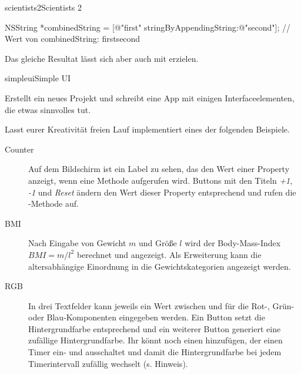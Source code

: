 \documentclass[parskip=half, final]{scrreprt}
\begin{document}
\begin{lecture}
\begin{exc}
\begin{excitem}{scientists2}{Scientists 2}
\begin{objclst}
NSString *combinedString = [@"first" stringByAppendingString:@"second"];
// Wert von combinedString: firstsecond
\end{objclst}
Das gleiche Resultat lässt sich aber auch mit  erzielen.

\end{excitem}

\begin{excitem}{simpleui}{Simple UI}

Erstellt ein neues Projekt und schreibt eine App mit einigen Interfaceelementen, die etwas sinnvolles tut.

Lasst eurer Kreativität freien Lauf  implementiert eines der folgenden Beispiele.

\begin{description}
\item[Counter] Auf dem Bildschirm ist ein Label zu sehen, das den Wert einer Property  anzeigt, wenn eine Methode  aufgerufen wird. Buttons mit den Titeln \emph{+1}, \emph{-1} und \emph{Reset} ändern den Wert dieser Property entsprechend und rufen die -Methode auf.
\item[BMI] Nach Eingabe von Gewicht $m$ und Größe $l$ wird der Body-Mass-Index  $BMI=m/l^2$ berechnet und angezeigt. Als Erweiterung kann die altersabhängige Einordnung in die Gewichtskategorien angezeigt werden.
\item[RGB] In drei Textfelder kann jeweils ein Wert zwischen  und  für die Rot-, Grün- oder Blau-Komponenten eingegeben werden. Ein Button setzt die Hintergrundfarbe  entsprechend und ein weiterer Button generiert eine zufällige Hintergrundfarbe. Ihr könnt noch einen  hinzufügen, der einen Timer ein- und ausschaltet und damit die Hintergrundfarbe bei jedem Timerintervall zufällig wechselt (s. Hinweis).
\end{description}


\end{excitem}
\end{exc}
\end{lecture}
\end{document}
